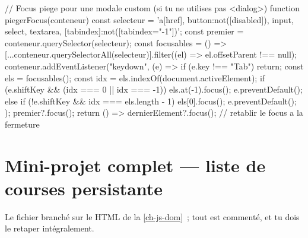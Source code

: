 \begin{codejs}
// Focus piege pour une modale custom (si tu ne utilises pas <dialog>)
function piegerFocus(conteneur) {
  const selecteur = 'a[href], button:not([disabled]), input, select, textarea, [tabindex]:not([tabindex="-1"])';
  const premier = conteneur.querySelector(selecteur);
  const focusables = () => [...conteneur.querySelectorAll(selecteur)].filter((el) => el.offsetParent !== null);
  conteneur.addEventListener("keydown", (e) => {
    if (e.key !== "Tab") return;
    const els = focusables();
    const idx = els.indexOf(document.activeElement);
    if (e.shiftKey && (idx === 0 || idx === -1)) { els.at(-1).focus(); e.preventDefault(); }
    else if (!e.shiftKey && idx === els.length - 1) { els[0].focus(); e.preventDefault(); }
  });
  premier?.focus();
  return () => dernierElement?.focus();       // retablir le focus a la fermeture
}
\end{codejs}

\section{Mini-projet complet --- liste de courses persistante}

Le fichier  branch\'e sur le HTML de la \cref{ch-js-dom}~; tout est comment\'e,
et tu dois le retaper int\'egralement.

